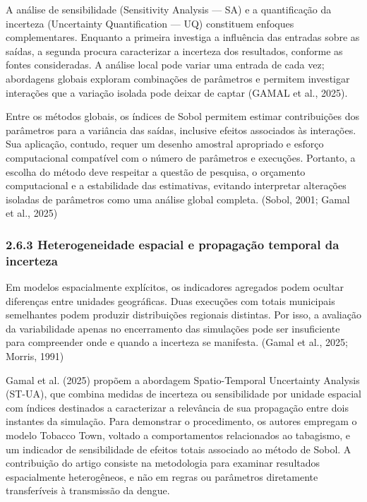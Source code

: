 A análise de sensibilidade (Sensitivity Analysis --- SA) e a
quantificação da incerteza (Uncertainty Quantification --- UQ)
constituem enfoques complementares. Enquanto a primeira investiga a
influência das entradas sobre as saídas, a segunda procura caracterizar
a incerteza dos resultados, conforme as fontes consideradas. A análise
local pode variar uma entrada de cada vez; abordagens globais exploram
combinações de parâmetros e permitem investigar interações que a
variação isolada pode deixar de captar (GAMAL et al., 2025).

Entre os métodos globais, os índices de Sobol permitem estimar
contribuições dos parâmetros para a variância das saídas, inclusive
efeitos associados às interações. Sua aplicação, contudo, requer um
desenho amostral apropriado e esforço computacional compatível com o
número de parâmetros e execuções. Portanto, a escolha do método deve
respeitar a questão de pesquisa, o orçamento computacional e a
estabilidade das estimativas, evitando interpretar alterações isoladas
de parâmetros como uma análise global completa. (Sobol, 2001; Gamal et
al., 2025)

\subsubsection{2.6.3 Heterogeneidade espacial e propagação temporal da
incerteza}\label{heterogeneidade-espacial-e-propagauxe7uxe3o-temporal-da-incerteza}

Em modelos espacialmente explícitos, os indicadores agregados podem
ocultar diferenças entre unidades geográficas. Duas execuções com totais
municipais semelhantes podem produzir distribuições regionais distintas.
Por isso, a avaliação da variabilidade apenas no encerramento das
simulações pode ser insuficiente para compreender onde e quando a
incerteza se manifesta. (Gamal et al., 2025; Morris, 1991)

Gamal et al. (2025) propõem a abordagem Spatio-Temporal Uncertainty
Analysis (ST-UA), que combina medidas de incerteza ou sensibilidade por
unidade espacial com índices destinados a caracterizar a relevância de
sua propagação entre dois instantes da simulação. Para demonstrar o
procedimento, os autores empregam o modelo Tobacco Town, voltado a
comportamentos relacionados ao tabagismo, e um indicador de
sensibilidade de efeitos totais associado ao método de Sobol. A
contribuição do artigo consiste na metodologia para examinar resultados
espacialmente heterogêneos, e não em regras ou parâmetros diretamente
transferíveis à transmissão da dengue.

